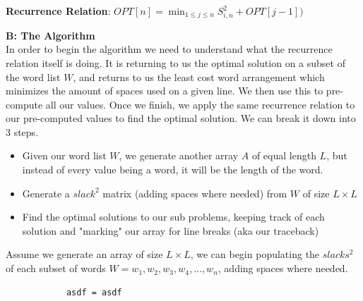 \documentclass[11pt]{article}
\begin{document}
\begin{solution}
		\hfil
		
		
		\begin{center}
			\textbf{Recurrence Relation}: $OPT[n] = \displaystyle\min_{1\leq j \leq n} S^2_{i,n}+ OPT[j - 1])$
		\end{center}
		
		
		
	
	\hfil
	
	\textbf{B: The Algorithm} \\
	
	In order to begin the algorithm we need to understand what the recurrence relation itself is doing. It is returning to us the optimal solution on a subset of the word list $W$, and returns to us the least cost word arrangement which minimizes the amount of spaces used on a given line. We then use this to pre-compute all our values. Once we finish, we apply the same recurrence relation to our pre-computed values to find the optimal solution. We can break it down into 3 steps.  
	
	\begin{itemize}
		\item Given our word list $W$, we generate another array $A$ of equal length $L$, but instead of every value being a word, it will be the length of the word.
  		\item Generate a $slack^2$ matrix (adding spaces where needed) from $W$ of size $L \times L$ 
  		\item Find the optimal solutions to our sub problems, keeping track of each solution and "marking" our array for line breaks (aka our traceback)
	\end{itemize}
	
	Assume we generate an array of size $L \times L$, we can begin populating the $slacks^2$ of each subset of words $W = {w_1, w_2, w_3, w_4, ... , w_n }$, adding spaces where needed.
	
	
	\begin{center}
			\begin{lstlisting}
			asdf = asdf
		\end{lstlisting}
	\end{center}

	
		
	
\end{solution}



\begin{solution}
	
\end{solution}
\end{document}
